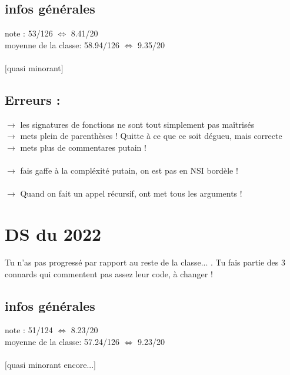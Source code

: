 \documentclass{book}
\begin{document}
\subsection{infos générales}

note : 53/126 $\Leftrightarrow$ 8.41/20 \\
moyenne de la classe: 58.94/126 $\Leftrightarrow$ 9.35/20 \\ \\
$[$quasi minorant$]$

\subsection{Erreurs :}

$\rightarrow$ les signatures de fonctions ne sont tout simplement pas maîtrisés \\
$\rightarrow$ mets plein de parenthèses ! Quitte à ce que ce soit dégueu, mais correcte \\
$\rightarrow$ mets plus de commentares putain ! \\ \\
$\rightarrow$ fais gaffe à la compléxité putain, on est pas en NSI bordèle ! \\ \\
$\rightarrow$ Quand on fait un appel récursif, ont met tous les arguments ! \\




\section{DS du  2022}

\begin{tcolorbox}[width={14cm},colback={yellow!20!white},title={\textbf{Commentaire générale sur ce DS}},colbacktitle=red!40!white,coltitle=black]
	Tu n'as pas progressé par rapport au reste de la classe... . Tu fais partie des 3 connards qui commentent pas assez leur code, à changer !
\end{tcolorbox}

\subsection{infos générales}

note : 51/124 $\Leftrightarrow$ 8.23/20 \\
moyenne de la classe: 57.24/126 $\Leftrightarrow$ 9.23/20 \\ \\
$[$quasi minorant encore...$]$
\end{document}
